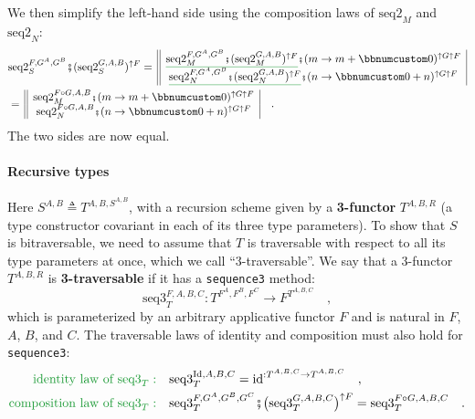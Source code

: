 We then simplify the left-hand side using the composition laws of
$\text{seq2}_{M}$ and $\text{seq2}_{N}$:
\begin{align*}
 & \text{seq2}_{S}^{F,G^{A},G^{B}}\bef(\text{seq2}_{S}^{G,A,B})^{\uparrow F}=\,\begin{array}{||c|}
\gunderline{\text{seq2}_{M}^{F,G^{A},G^{B}}\bef(\text{seq2}_{M}^{G,A,B})^{\uparrow F}}\bef(m\rightarrow m+\bbnum 0)^{\uparrow G\uparrow F}\\
\gunderline{\text{seq2}_{N}^{F,G^{A},G^{B}}\bef(\text{seq2}_{N}^{G,A,B})^{\uparrow F}}\bef(n\rightarrow\bbnum 0+n)^{\uparrow G\uparrow F}
\end{array}\\
 & =\,\begin{array}{||c|}
\text{seq2}_{M}^{F\circ G,A,B}\bef(m\rightarrow m+\bbnum 0)^{\uparrow G\uparrow F}\\
\text{seq2}_{N}^{F\circ G,A,B}\bef(n\rightarrow\bbnum 0+n)^{\uparrow G\uparrow F}
\end{array}\quad.
\end{align*}
The two sides are now equal.

\paragraph{Recursive types}

Here $S^{A,B}\triangleq T^{A,B,S^{A,B}}$, with a recursion scheme
given by a \textbf{3-functor} $T^{A,B,R}$ (a
type constructor covariant in each of its three type parameters).
To show that $S$ is bitraversable, we need to assume that $T$ is
traversable with respect to all its type parameters at once, which
we call \textsf{``}3-traversable\textsf{''}. We say that a 3-functor $T^{A,B,R}$
is \textbf{3-traversable} if it
has a \lstinline!sequence3! method:
\[
\text{seq3}_{T}^{F,A,B,C}:T^{F^{A},F^{B},F^{C}}\rightarrow F^{T^{A,B,C}}\quad,
\]
which is parameterized by an arbitrary applicative functor $F$ and
is natural in $F$, $A$, $B$, and $C$. The traversable laws of
identity
and composition
must also hold for \lstinline!sequence3!:
\begin{align}
{\color{greenunder}\text{identity law of }\text{seq3}_{T}:}\quad & \text{seq3}_{T}^{\text{Id},A,B,C}=\text{id}^{:T^{A,B,C}\rightarrow T^{A,B,C}}\quad,\label{eq:identity-law-of-trisequence}\\
{\color{greenunder}\text{composition law of }\text{seq3}_{T}:}\quad & \text{seq3}_{T}^{F,G^{A},G^{B},G^{C}}\bef\big(\text{seq3}_{T}^{G,A,B,C}\big)^{\uparrow F}=\text{seq3}_{T}^{F\circ G,A,B,C}\quad.\label{eq:composition-law-of-trisequence}
\end{align}

